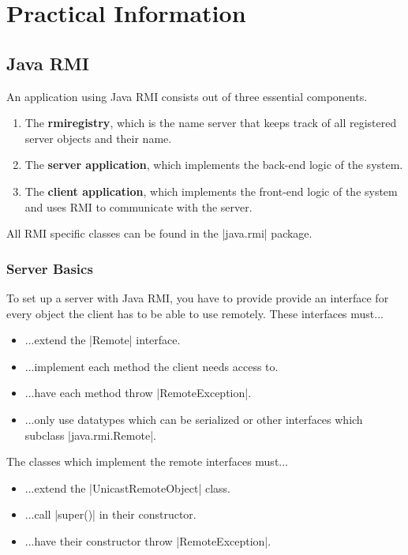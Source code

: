 \documentclass[a4paper]{article}
\begin{document}
\newpage

\section{Practical Information}

\subsection{Java RMI}

An application using Java RMI consists out of three essential components.

\begin{enumerate}
\item The \textbf{rmiregistry}, which is the name server that keeps track of all registered server objects and their name.
\item The \textbf{server application}, which implements the back-end logic of the system.
\item The \textbf{client application}, which implements the front-end logic of the system and uses RMI to communicate with the server.
\end{enumerate}

All RMI specific classes can be found in the |java.rmi| package.

\subsubsection{Server Basics}

To set up a server with Java RMI, you have to provide provide an interface for every object the client has to be able to use remotely. These interfaces must...

\begin{itemize}
\item ...extend the |Remote| interface.
\item ...implement each method the client needs access to.
\item ...have each method throw |RemoteException|.
\item ...only use datatypes which can be serialized or other interfaces which subclass |java.rmi.Remote|.
\end{itemize}

The classes which implement the remote interfaces must...

\begin{itemize}
\item ...extend the |UnicastRemoteObject| class.
\item ...call |super()| in their constructor.
\item ...have their constructor throw |RemoteException|.
\end{itemize}
\end{document}

